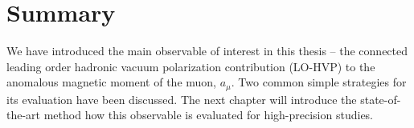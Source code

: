 



\section{Summary}
\label{sec:2pt:summary}


We have introduced the main observable of interest in this thesis -- the connected leading order hadronic vacuum polarization contribution (LO-HVP) to the anomalous magnetic moment of the muon, $a_{\mu}$.
Two common simple strategies for its evaluation have been discussed.
The next chapter will introduce the state-of-the-art method how this observable is evaluated for high-precision studies.


